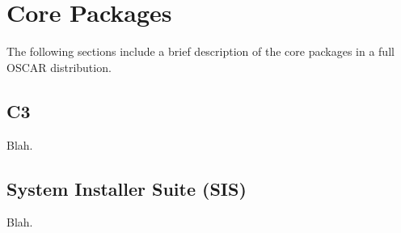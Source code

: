 %
%
%

\section{Core Packages}

The following sections include a brief description of the core
packages in a full OSCAR distribution.


\subsection{C3}

Blah.

\subsection{System Installer Suite (SIS)}

Blah.
